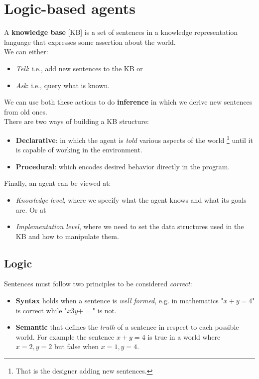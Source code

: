 \documentclass[10pt,a4paper]{article}
\begin{document}
\section{Logic-based agents}
A \textbf{knowledge base} [KB] is a set of sentences in a knowledge representation language that expresses some assertion about the world.\\
We can either:
\begin{itemize}
\item \textit{Tell}: i.e., add new sentences to the KB or
\item \textit{Ask}: i.e., query what is known.
\end{itemize}
We can use both these actions to do \textbf{inference} in which we derive new sentences from old ones.\\

There are two ways of building a KB structure:
\begin{itemize}
\item \textbf{Declarative}: in which the agent is \textit{told} various aspects of the world \footnote{That is the designer adding new sentences.} until it is capable of working in the environment.
\item \textbf{Procedural}: which encodes desired behavior directly in the program.
\end{itemize}

Finally, an agent can be viewed at:
\begin{itemize}
\item \textit{Knowledge level}, where we specify what the agent knows and what its goals are. Or at
\item \textit{Implementation level}, where we need to set the data structures used in the KB and how to manipulate them.
\end{itemize}

\subsection{Logic}
\label{sec:logic}
Sentences must follow two principles to be considered \textit{correct}:
\begin{itemize}
\item \textbf{Syntax} holds when a sentence is \textit{well formed}, e.g. in mathematics "$x+y=4$" is correct while "$x3y +=$" is not.
\item \textbf{Semantic}  that defines the \textit{truth} of a sentence in respect to each possible world. For example the sentence $x+y=4$ is true in a world where $x=2,y=2$ but false when $x=1,y=4$.
\end{itemize}
\end{document}
